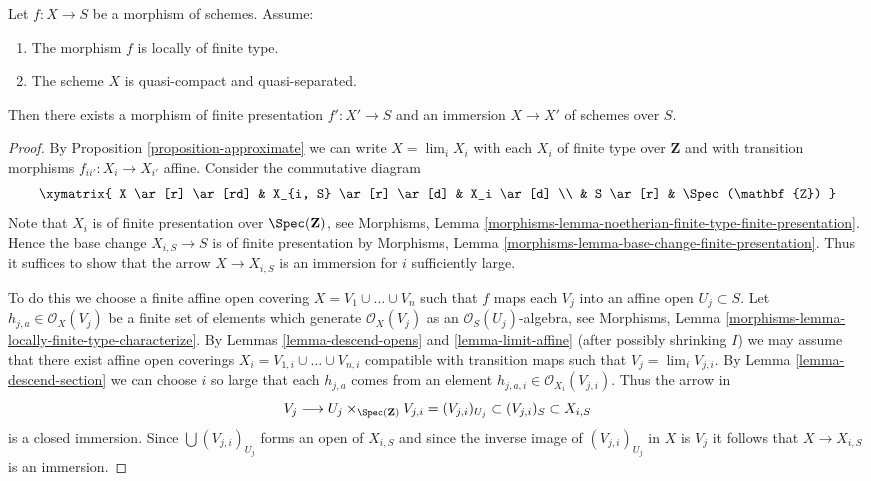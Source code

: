 \begin{lemma}
\label{lemma-locally-finite-type-in-finite-presentation}
Let $f : X \to S$ be a morphism of schemes.
Assume:
\begin{enumerate}
\item The morphism $f$ is locally of finite type.
\item The scheme $X$ is quasi-compact and quasi-separated.
\end{enumerate}
Then there exists a morphism of finite presentation
$f' : X' \to S$ and an immersion $X \to X'$ of schemes over $S$.
\end{lemma}

\begin{proof}
By
Proposition \ref{proposition-approximate}
we can write
$X = \lim_i X_i$ with each $X_i$ of finite type over $\mathbf{Z}$ and
with transition morphisms $f_{ii'} : X_i \to X_{i'}$ affine.
Consider the commutative diagram
$$
\xymatrix{
X \ar[r] \ar[rd] & X_{i, S} \ar[r] \ar[d] & X_i \ar[d] \\
& S \ar[r] & \Spec(\mathbf{Z})
}
$$
Note that $X_i$ is of finite presentation over $\Spec(\mathbf{Z})$, see
Morphisms,
Lemma \ref{morphisms-lemma-noetherian-finite-type-finite-presentation}.
Hence the base change $X_{i, S} \to S$ is of finite presentation by
Morphisms, Lemma \ref{morphisms-lemma-base-change-finite-presentation}.
Thus it suffices to show that the arrow $X \to X_{i, S}$ is an
immersion for $i$ sufficiently large.

\medskip\noindent
To do this we choose a finite affine open covering
$X = V_1 \cup \ldots \cup V_n$ such that
$f$ maps each $V_j$ into an affine open $U_j \subset S$.
Let $h_{j, a} \in \mathcal{O}_X(V_j)$ be a finite
set of elements which generate $\mathcal{O}_X(V_j)$ as
an $\mathcal{O}_S(U_j)$-algebra, see
Morphisms, Lemma \ref{morphisms-lemma-locally-finite-type-characterize}.
By Lemmas \ref{lemma-descend-opens} and \ref{lemma-limit-affine}
(after possibly shrinking $I$) we may assume that
there exist affine open coverings
$X_i = V_{1, i} \cup \ldots \cup V_{n, i}$
compatible with transition maps such that $V_j = \lim_i V_{j, i}$.
By Lemma \ref{lemma-descend-section} we can choose $i$ so large that each
$h_{j, a}$ comes from an element
$h_{j, a, i} \in \mathcal{O}_{X_i}(V_{j, i})$.
Thus the arrow in
$$
V_j \longrightarrow U_j \times_{\Spec(\mathbf{Z})} V_{j, i} =
(V_{j, i})_{U_j} \subset (V_{j, i})_S \subset X_{i, S}
$$
is a closed immersion. Since $\bigcup (V_{j, i})_{U_j}$ forms an open of
$X_{i, S}$ and since the inverse image of $(V_{j, i})_{U_j}$ in $X$
is $V_j$ it follows that $X \to X_{i, S}$ is an immersion.
\end{proof}
